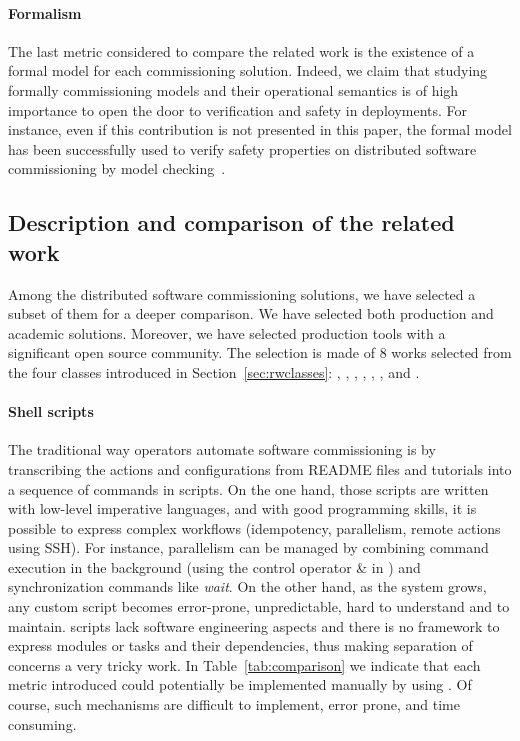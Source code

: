 \paragraph{Formalism}
The last metric considered to compare the related work is the existence of a formal model for each commissioning solution. Indeed, we claim that studying formally commissioning models and their operational semantics is of high importance to open the door to verification and safety in deployments. For instance, even if this contribution is not presented in this paper, the formal model \mad has been successfully used to verify safety properties on distributed software commissioning by model checking~\cite{coullon:hal-02323641}.

\subsection{Description and comparison of the related work}

Among the distributed software commissioning solutions, we have selected a subset of them for a deeper comparison. We have selected both production and academic solutions. Moreover, we have selected production tools with a significant open source community.
%
The selection is made of 8 works selected from the four classes introduced in Section~\ref{sec:rwclasses}: \shell, \fractal, \ansible, \deployware, \aeolus, \juju, \tosca and \kubernetes.

\paragraph{Shell scripts}
The traditional way operators automate software commissioning is by transcribing the actions and configurations from README files and tutorials into a sequence of commands in \shell scripts. On the one hand, those scripts are written with low-level imperative languages, and with good programming skills, it is possible to express complex workflows (\eg idempotency, parallelism, remote actions using SSH). For instance, parallelism can be managed by combining command execution in
the background (\eg using the control operator \& in \bash) and synchronization commands like \emph{wait}. On the other hand, as the system grows, any custom script becomes error-prone, unpredictable, hard to understand and to maintain. \shell scripts lack software engineering aspects and there is no framework to express modules or tasks and their dependencies, thus making separation of concerns a very tricky work. In Table~\ref{tab:comparison} we indicate that each
metric introduced could potentially be implemented manually by using \shell. Of course, such mechanisms are difficult to implement, error prone, and time consuming.

